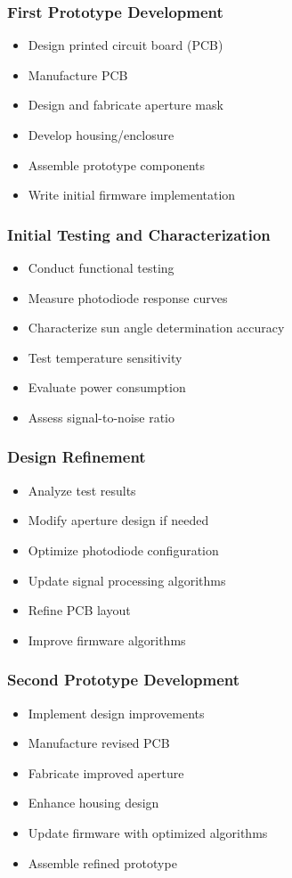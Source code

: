 \subsubsection*{First Prototype Development}
\begin{itemize}
  \item Design printed circuit board (PCB)
  \item Manufacture PCB
  \item Design and fabricate aperture mask
  \item Develop housing/enclosure
  \item Assemble prototype components
  \item Write initial firmware implementation
\end{itemize}

\subsubsection*{Initial Testing and Characterization}
\begin{itemize}
  \item Conduct functional testing
  \item Measure photodiode response curves
  \item Characterize sun angle determination accuracy
  \item Test temperature sensitivity
  \item Evaluate power consumption
  \item Assess signal-to-noise ratio
\end{itemize}

\subsubsection*{Design Refinement}
\begin{itemize}
  \item Analyze test results
  \item Modify aperture design if needed
  \item Optimize photodiode configuration
  \item Update signal processing algorithms
  \item Refine PCB layout
  \item Improve firmware algorithms
\end{itemize}

\subsubsection*{Second Prototype Development}
\begin{itemize}
  \item Implement design improvements
  \item Manufacture revised PCB
  \item Fabricate improved aperture
  \item Enhance housing design
  \item Update firmware with optimized algorithms
  \item Assemble refined prototype
\end{itemize}

